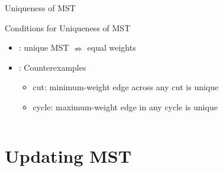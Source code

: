 \begin{frame}{Uniqueness of MST}
  \begin{block}{Conditions for Uniqueness of MST }
    \begin{itemize}
      \item {}: unique MST $\nRightarrow$ equal weights
      \item {}: Counterexamples
        \begin{itemize}
          \item \xmark cut: minimum-weight edge across any cut is unique
          \item \xmark cycle: maximum-weight edge in any cycle is unique
        \end{itemize}
        \begin{columns}
        \end{columns}
    \end{itemize}
  \end{block}
\end{frame}
\section{Updating MST}

